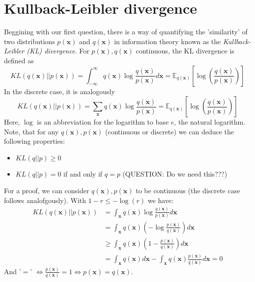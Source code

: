 \documentclass[12pt]{report}
\theoremstyle{definition}
\begin{document}
\section{Kullback-Leibler divergence}
Beggining with our first question, there is a way of quantifying the 'similarity' of two distributions $p(\mathbf{x})$ and $q(\mathbf{x})$ in information theory known as the \emph{Kullback-Leibler (KL) divergence}. For $p(\mathbf{x}), q(\mathbf{x})$ continuous, the KL divergence is defined as %
\begin{equation}
	KL(q(\mathbf{x})||p(\mathbf{x})) = \int_{-\infty}^{\infty} q(\mathbf{x}) \log \frac{q(\mathbf{x})}{p(\mathbf{x})} d \mathbf{x} = \mathbb{E}_{q(\mathbf{x})}\left[ \log\left(\frac{q(\mathbf{x})}{p(\mathbf{x})} \right) \right]
\end{equation}
In the discrete case, it is analogously 
\begin{equation}
	KL(q(\mathbf{x})||p(\mathbf{x})) = \sum_{\mathbf{x}} q(\mathbf{x}) \log \frac{q(\mathbf{x})}{p(\mathbf{x})} = \mathbb{E}_{q(\mathbf{x})}\left[ \log\left(\frac{q(\mathbf{x})}{p(\mathbf{x})} \right) \right]
\end{equation}
Here, $\log$ is an abbreviation for the logarithm to base $e$, the natural logarithm. Note, that for any $q(\mathbf{x}), p(\mathbf{x})$ (continuous or discrete) we can deduce the following properties:
\begin{itemize}
	\item $KL(q||p) \geq 0$
	\item $KL(q||p) = 0$ if and only if $q = p$ (QUESTION: Do we need this???)
\end{itemize}
For a proof, we can consider $q(\mathbf{x}), p(\mathbf{x})$ to be continuous (the discrete case follows analofgously). With $1 - r \leq -\log(r)$ we have:
\begin{equation}
\begin{split}
KL(q(\mathbf{x})||p(\mathbf{x})) 
& = \int_{\mathbf{x}} q(\mathbf{x}) \log \frac{q(\mathbf{x})}{p(\mathbf{x})} d \mathbf{x} \\
& = \int_{\mathbf{x}} q(\mathbf{x}) (- \log \frac{p(\mathbf{x})}{q(\mathbf{x})}) d \mathbf{x} \\
& \geq \int_{\mathbf{x}} q(\mathbf{x}) (1 - \frac{p(\mathbf{x})}{q(\mathbf{x})}) d \mathbf{x} \\
& = \int_{\mathbf{x}} q(\mathbf{x}) d \mathbf{x} - \int_{\mathbf{x}} q(\mathbf{x}) \frac{p(\mathbf{x})}{q(\mathbf{x})} d \mathbf{x} = 0 
\end{split}
\end{equation}
And '$=$' $ \Leftrightarrow \frac{p(\mathbf{x})}{q(\mathbf{x})} = 1 \Leftrightarrow p(\mathbf{x})=q(\mathbf{x})$.
\end{document}
